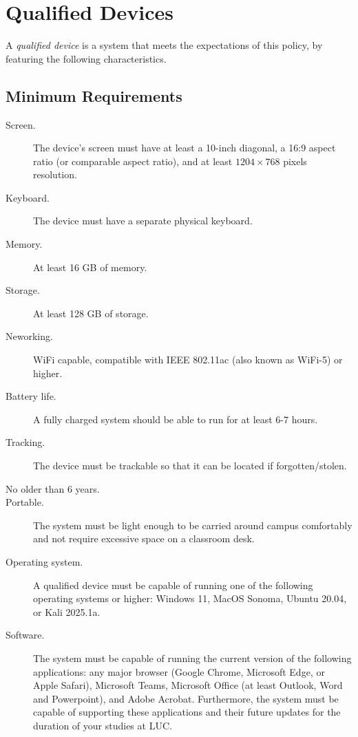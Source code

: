 \section{Qualified Devices}

A \emph{qualified device} is a system that meets the expectations of this policy, by featuring the following characteristics.

\subsection*{Minimum Requirements}
    
\begin{description}

    \item [Screen.] The device's screen must have at least a 10-inch diagonal, a 16:9 aspect ratio (or comparable aspect ratio), and at least $1204\times 768$ pixels resolution.

    \item [Keyboard.] The device must have a separate physical keyboard. 

    \item[Memory.] At least 16 GB of memory.

    \item[Storage.] At least 128 GB of storage.

    \item[Neworking.] WiFi capable, compatible with IEEE 802.11ac (also known as WiFi-5) or higher.

    \item[Battery life.] A fully charged system should be able to run for at least 6-7 hours.

    \item[Tracking.] The device must be trackable so that it can be located if forgotten/stolen.

    \item[No older than 6 years.]

    \item[Portable.] The system must be light enough to be carried around campus comfortably and not require excessive space on a classroom desk.

    \item[Operating system.] A qualified device must be capable of running one of the following operating systems or higher: Windows 11, MacOS Sonoma, Ubuntu 20.04, or Kali 2025.1a.

    \item[Software.] The system must be capable of running the current version of the following applications: any major browser (Google Chrome, Microsoft Edge, or Apple Safari), Microsoft Teams, Microsoft Office (at least Outlook, Word and Powerpoint), and Adobe Acrobat. Furthermore, the system must be capable of supporting these applications and their future updates for the duration of your studies at LUC.


\end{description}
